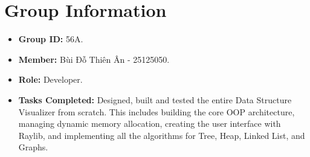 \section{Group Information}
\begin{itemize}
    \item \textbf{Group ID:} 56A.
    \item \textbf{Member:} Bùi Đỗ Thiên Ân - 25125050.
    \item \textbf{Role:} Developer.
    \item \textbf{Tasks Completed:} Designed, built and tested the entire Data Structure Visualizer from scratch. This includes building the core OOP architecture, managing dynamic memory allocation, creating the user interface with Raylib, and implementing all the algorithms for Tree, Heap, Linked List, and Graphs.
\end{itemize}